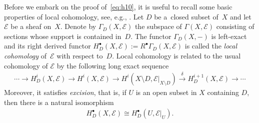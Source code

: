 \documentclass[pdftex]{sigma}
\numberwithin{equation}{section}
\newcommand{\cE}{\mathcal{E}}
\newcommand{\sE}{\mathscr{E}}
\newcommand{\iso}{\cong}
\begin{document}
Before we embark on the proof of~\eqref{eq:h10}, it is useful to
recall some basic properties of local cohomology, see, e.g.,
\cite[Chapter~III, Exercise~2.3]{Hartshorne1977}.  Let $D$ be a~closed subset of~$X$ and let~$\cE$ be a sheaf on~$X$.  Denote by
$\Gamma_D(X,\sE)$ the subspace of $\Gamma(X,\sE)$ consisting of
sections whose support is contained in~$D$.  The functor
$\Gamma_D(X,-)$ is left-exact and its right derived functor
$H^\bullet_D(X,\sE):=R^\bullet\Gamma_D(X,\sE)$ is called the
\emph{local cohomology} of~$\cE$ with respect to~$D$.  Local
cohomology is related to the usual cohomology of $\cE$ by the
following long exact sequence
\begin{gather}\label{eq:les}
  \cdots \to H^i_D(X,\sE) \to H^i(X,\sE) \to H^i(X{\setminus}
  D,\sE|_{X{\setminus} D}) \stackrel{\delta}{\to} H^{i+1}_D(X,\sE) \to
  \cdots
\end{gather}
Moreover, it satisf\/ies \emph{excision}, that is, if $U$ is an open
subset in $X$ containing $D$, then there is a natural isomorphism
\begin{gather*}
  H^\bullet_D(X,\cE) \iso H^\bullet_D(U,\cE|_U).
\end{gather*}
\end{document}
